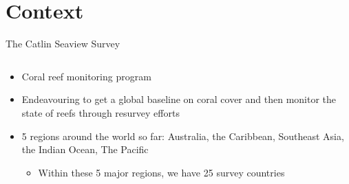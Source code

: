 \documentclass{beamer}
\begin{document}
    \section{Context}
        \begin{frame}{The Catlin Seaview Survey}
          \begin{columns}[T]
            \begin{column}{0.45\textwidth}
              \begin{itemize}
                \item Coral reef monitoring program
                \item Endeavouring to get a global baseline on coral cover and then monitor the state of reefs through resurvey efforts
                \item 5 regions around the world so far: Australia, the Caribbean, Southeast Asia, the Indian Ocean, The Pacific
                  \begin{itemize}
                    \item Within these 5 major regions, we have 25 survey countries
                  \end{itemize}
              \end{itemize}
            \end{column}


\end{columns}
\end{frame}
\end{document}
